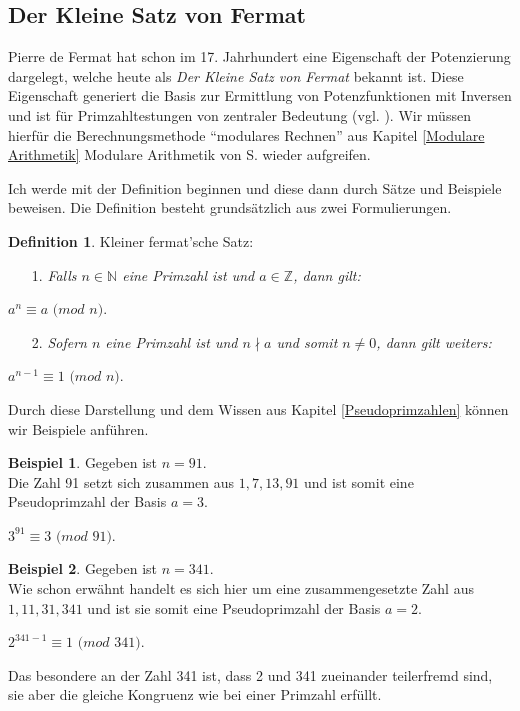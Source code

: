 \documentclass[12pt,a4paper]{article}
\theoremstyle{definition}
\newtheorem{defi}{Definition}[section]
\newtheorem{bsp}{Beispiel}[subsection]
\begin{document}
\subsection{Der Kleine Satz von Fermat}\label{Der Kleine Satz von Fermat}
Pierre de Fermat hat schon im 17. Jahrhundert eine Eigenschaft der Potenzierung dargelegt, welche heute als \textit{Der Kleine Satz von Fermat} bekannt ist. 
Diese Eigenschaft generiert die Basis zur Ermittlung von Potenzfunktionen mit Inversen und ist für Primzahltestungen von zentraler Bedeutung (vgl. \cite[303]{Meinel2015}).
Wir müssen hierfür die Berechnungsmethode “modulares Rechnen” aus Kapitel \ref{Modulare Arithmetik} Modulare Arithmetik von S. \pageref{Modulare Arithmetik} wieder aufgreifen.

Ich werde mit der Definition beginnen und diese dann durch Sätze und Beispiele beweisen.
Die Definition besteht grundsätzlich aus zwei Formulierungen.
\begin{defi} Kleiner fermat'sche Satz: \label{Kleiner fermat'sche Satz}
\begin{enumerate}
    \item[1.]\textit{Falls $n \in \mathbb{N}$ eine Primzahl ist und $a \in \mathbb{Z}$, dann gilt:}\end{enumerate}
\begin{center}
$a^{n} \equiv a$ $(mod$ $n)$.
\end{center}
\begin{enumerate}
    \item[2.]\textit{Sofern $n$ eine Primzahl ist und $n \nmid a$ und somit $n \neq 0$, dann gilt weiters:}\end{enumerate}
\begin{center}
$a^{n-1} \equiv 1$ $(mod$ $n)$.
\end{center}\end{defi}

Durch diese Darstellung und dem Wissen aus Kapitel \ref{Pseudoprimzahlen} können wir Beispiele anführen.

\begin{bsp} Gegeben ist $n = 91$.\\
Die Zahl 91 setzt sich zusammen aus $1, 7, 13, 91$ und ist somit eine Pseudoprimzahl der Basis $a = 3$.
\begin{center}
$3^{91} \equiv 3$ $(mod$ $91)$.
\end{center}\end{bsp}
\begin{bsp} Gegeben ist $n = 341$.\\
Wie schon erwähnt handelt es sich hier um eine zusammengesetzte Zahl aus $1, 11, 31, 341$ und ist sie somit eine Pseudoprimzahl der Basis $a = 2$.
\begin{center}
$2^{341-1} \equiv 1$ $(mod$ $341)$.
\end{center}\end{bsp}
Das besondere an der Zahl 341 ist, dass 2 und 341 zueinander teilerfremd sind, sie aber die gleiche Kongruenz wie bei einer Primzahl erfüllt.
\end{document}
